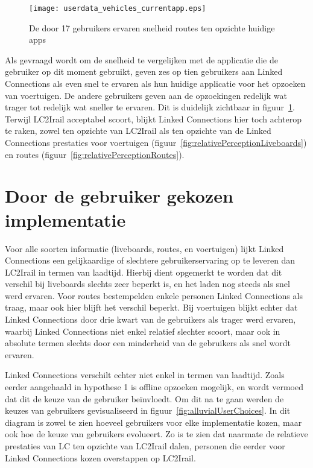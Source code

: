 \begin{figure}[ht]
	\centering
	\texttt{[image: userdata\_vehicles\_currentapp.eps]}
	\caption[Door gebruikers ervaren snelheid voertuigen tov huidige apps]{De door 17 gebruikers ervaren snelheid routes ten opzichte huidige apps }
	\label{fig:relativePerceptionVehicles}
\end{figure}

Als gevraagd wordt om de snelheid te vergelijken met de applicatie die de gebruiker op dit moment gebruikt, geven zes op tien gebruikers aan Linked Connections als even snel te ervaren als hun huidige applicatie voor het opzoeken van voertuigen. De andere gebruikers geven aan de opzoekingen redelijk wat trager tot redelijk wat sneller te ervaren. Dit is duidelijk zichtbaar in figuur~\ref{fig:relativePerceptionVehicles}. Terwijl LC2Irail acceptabel scoort, blijkt Linked Connections hier toch achterop te raken, zowel ten opzichte van LC2Irail als ten opzichte van de Linked Connections prestaties voor voertuigen (figuur~\ref{fig:relativePerceptionLiveboards}) en routes (figuur~\ref{fig:relativePerceptionRoutes}).

\section{Door de gebruiker gekozen implementatie}

Voor alle soorten informatie (liveboards, routes, en voertuigen) lijkt Linked Connections een gelijkaardige of slechtere gebruikerservaring op te leveren dan LC2Irail in termen van laadtijd. Hierbij dient opgemerkt te worden dat dit verschil bij liveboards slechts zeer beperkt is, en het laden nog steeds als snel werd ervaren. Voor routes bestempelden enkele personen Linked Connections als traag, maar ook hier blijft het verschil beperkt. Bij voertuigen blijkt echter dat Linked Connections door drie kwart van de gebruikers als trager werd ervaren, waarbij Linked Connections niet enkel relatief slechter scoort, maar ook in absolute termen slechts door een minderheid van de gebruikers als snel wordt ervaren. 

Linked Connections verschilt echter niet enkel in termen van laadtijd. Zoals eerder aangehaald in hypothese 1 is offline opzoeken mogelijk, en wordt vermoed dat dit de keuze van de gebruiker beïnvloedt. Om dit na te gaan werden de keuzes van gebruikers gevisualiseerd in figuur~\ref{fig:alluvialUserChoices}. In dit diagram is zowel te zien hoeveel gebruikers voor elke implementatie kozen, maar ook hoe de keuze van gebruikers evolueert. Zo is te zien dat naarmate de relatieve prestaties van LC ten opzichte van LC2Irail dalen, personen die eerder voor Linked Connections kozen overstappen op LC2Irail.

